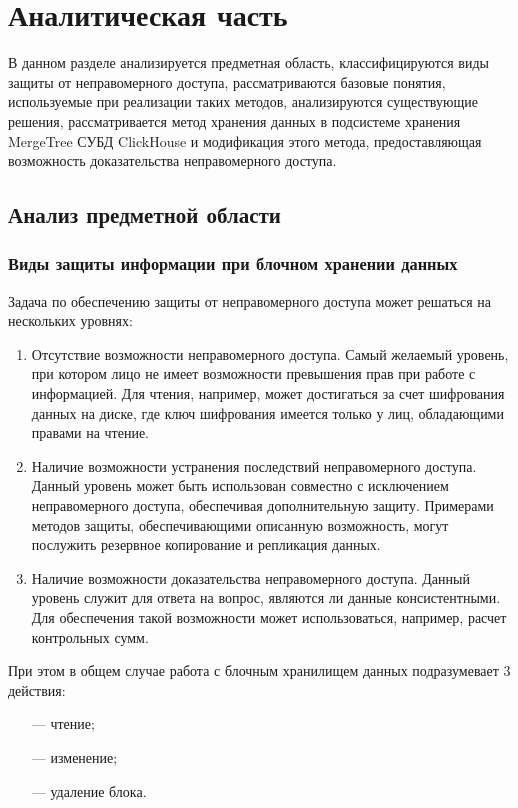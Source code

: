 \section{Аналитическая часть}

В данном разделе анализируется предметная область, классифицируются виды защиты от неправомерного доступа, рассматриваются базовые понятия, используемые при реализации таких методов, анализируются существующие решения, рассматривается метод хранения данных в подсистеме хранения MergeTree СУБД ClickHouse и модификация этого метода, предоставляющая возможность доказательства неправомерного доступа.

\subsection{Анализ предметной области}

\subsubsection{Виды защиты информации при блочном хранении данных}

Задача по обеспечению защиты от неправомерного доступа может решаться на нескольких уровнях:
\begin{enumerate}
	\item Отсутствие возможности неправомерного доступа. Самый желаемый уровень, при котором лицо не имеет возможности превышения прав при работе с информацией. Для чтения, например, может достигаться за счет шифрования данных на диске, где ключ шифрования имеется только у лиц, обладающими правами на чтение.
	\item Наличие возможности устранения последствий неправомерного доступа. Данный уровень может быть использован совместно с исключением неправомерного доступа, обеспечивая дополнительную защиту. Примерами методов защиты, обеспечивающими описанную возможность, могут послужить резервное копирование и репликация данных.
	\item Наличие возможности доказательства неправомерного доступа. Данный уровень служит для ответа на вопрос, являются ли данные консистентными. Для обеспечения такой возможности может использоваться, например, расчет контрольных сумм.
\end{enumerate}

При этом в общем случае работа с блочным хранилищем данных подразумевает 3 действия:
\begin{enumerate}
	\item [---] чтение;
    \item [---] изменение;
	\item [---] удаление блока.
\end{enumerate}

